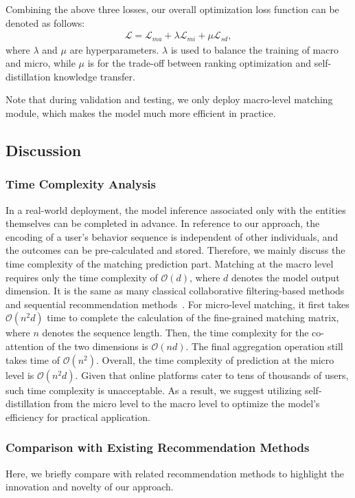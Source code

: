 Combining the above three losses, our overall optimization loss function can be denoted as follows: 
\begin{align}
    \mathcal{L} = \mathcal{L}_{ma} + \lambda \mathcal{L}_{mi} + \mu \mathcal{L}_{sd},
\end{align}
where $\lambda$ and $\mu$ are hyperparameters. $\lambda$ is used to balance the training of macro and micro, while $\mu$ is for the trade-off between ranking optimization and self-distillation knowledge transfer.

Note that during validation and testing, we only deploy macro-level matching module, which makes the model much more efficient in practice.

\subsection{Discussion}
\subsubsection{Time Complexity Analysis}
In a real-world deployment, the model inference associated only with the entities themselves can be completed in advance.
In reference to our approach, the encoding of a user's behavior sequence is independent of other individuals, and the outcomes can be pre-calculated and stored. 
Therefore, we mainly discuss the time complexity of the matching prediction part.
Matching at the macro level requires only the time complexity of $\mathcal{O}(d)$, where $d$ denotes the model output dimension. It is the same as many classical collaborative filtering-based methods~\cite{rendle2009bpr,neve2019latent} and sequential recommendation methods~\cite{kang2018self,sun2019bert4rec}.
For micro-level matching, it first takes $\mathcal{O}(n^2d)$ time to complete the calculation of the fine-grained matching matrix, where $n$ denotes the sequence length. Then, the time complexity for the co-attention of the two dimensions is $\mathcal{O}(nd)$. The final aggregation operation still takes time of $\mathcal{O}(n^2)$. Overall, the time complexity of prediction at the micro level is $\mathcal{O}(n^2d)$.
Given that online platforms cater to tens of thousands of users, such time complexity is unacceptable. As a result, we suggest utilizing self-distillation from the micro level to the macro level to optimize the model's efficiency for practical application.
\subsubsection{Comparison with Existing Recommendation Methods}
Here, we briefly compare with related recommendation methods to highlight the innovation and novelty of our approach.

